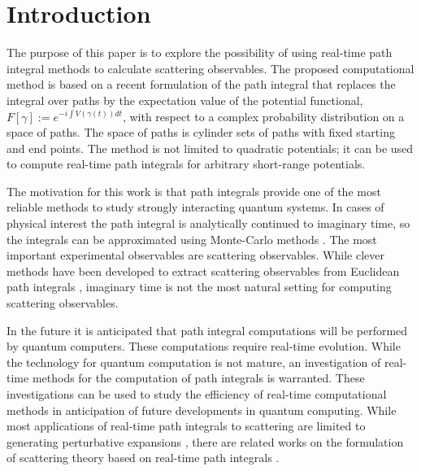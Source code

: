 \documentclass[aps,prc,reprint,noshowpacs,groupedaddress,onecolumn]{revtex4}
\begin{document}
\maketitle

\section{Introduction}

The purpose of this paper is to explore the possibility of using
real-time path integral methods \cite{Feynman_1}\cite{Feynman_2} to
calculate scattering observables.  The proposed computational method
is based on a recent formulation of the path integral
\cite{Muldowney}\cite{Katya_1}\cite{Katya_2} that replaces the
integral over paths by the expectation value of the potential
functional, $F[\gamma] := e^{-i \int V(\gamma(t)) dt}$, with respect
to a complex probability distribution on a space of paths.  The space
of paths is cylinder sets of paths with fixed starting and end points.
The method is not limited to quadratic potentials; it can be used to
compute real-time path integrals for arbitrary short-range potentials.

The motivation for this work is that path integrals provide one of the
most reliable methods to study strongly interacting quantum
systems. In cases of physical interest the path integral is
analytically continued to imaginary time, so the integrals can be
approximated using Monte-Carlo methods \cite{Ulam}\cite{Metropolis}.
The most important experimental observables are scattering
observables.  While clever methods have been developed to extract
scattering observables from Euclidean path integrals
\cite{Luscher}\cite{Luscher2}\cite{Lee}\cite{Luu}\cite{Gordon},
imaginary time is not the most natural setting for computing
scattering observables.

In the future it is anticipated that path integral computations will
be performed by quantum computers.  These computations require real-time
evolution.  While the technology for quantum computation is not
mature, an investigation of real-time methods for the computation
of path integrals is warranted.  These investigations can be used to
study the efficiency of real-time computational methods in
anticipation of future developments in quantum computing.  While most
applications of real-time path integrals to scattering are limited to
generating perturbative expansions \cite{Faddeev}, there are related
works on the formulation of scattering theory based on real-time path
integrals \cite{Rosenfelder1} \cite{Rosenfelder2} \cite{Campbell}.
\end{document}
